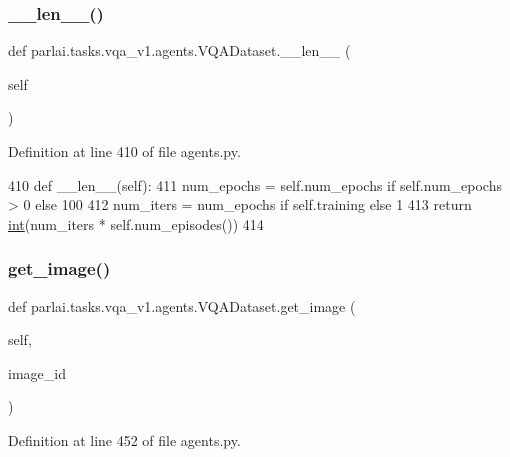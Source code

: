 \subsubsection{\texorpdfstring{\+\_\+\+\_\+len\+\_\+\+\_\+()}{\_\_len\_\_()}}
{\footnotesize\ttfamily def parlai.\+tasks.\+vqa\+\_\+v1.\+agents.\+V\+Q\+A\+Dataset.\+\_\+\+\_\+len\+\_\+\+\_\+ (\begin{DoxyParamCaption}\item[{}]{self }\end{DoxyParamCaption})}



Definition at line 410 of file agents.\+py.


\begin{DoxyCode}
410     \textcolor{keyword}{def }\_\_len\_\_(self):
411         num\_epochs = self.num\_epochs \textcolor{keywordflow}{if} self.num\_epochs > 0 \textcolor{keywordflow}{else} 100
412         num\_iters = num\_epochs \textcolor{keywordflow}{if} self.training \textcolor{keywordflow}{else} 1
413         \textcolor{keywordflow}{return} \hyperlink{namespacelanguage__model_1_1eval__ppl_a7d12ee00479673c5c8d1f6d01faa272a}{int}(num\_iters * self.num\_episodes())
414 
\end{DoxyCode}
\mbox{\label{classparlai_1_1tasks_1_1vqa__v1_1_1agents_1_1VQADataset_a416fc9e62c61ffa6b56b9e63b5d56132}} 
\subsubsection{\texorpdfstring{get\+\_\+image()}{get\_image()}}
{\footnotesize\ttfamily def parlai.\+tasks.\+vqa\+\_\+v1.\+agents.\+V\+Q\+A\+Dataset.\+get\+\_\+image (\begin{DoxyParamCaption}\item[{}]{self,  }\item[{}]{image\+\_\+id }\end{DoxyParamCaption})}



Definition at line 452 of file agents.\+py.


